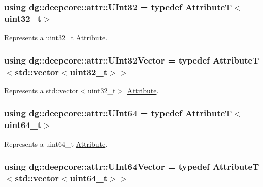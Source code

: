 \subsubsection[{\texorpdfstring{U\+Int32}{UInt32}}]{\setlength{\rightskip}{0pt plus 5cm}using {\bf dg\+::deepcore\+::attr\+::\+U\+Int32} = typedef AttributeT$<$uint32\+\_\+t$>$}\hypertarget{group___process_attributes_ga685518764bcfc2ffb146ef7eb5882b3b}{}\label{group___process_attributes_ga685518764bcfc2ffb146ef7eb5882b3b}


Represents a {\ttfamily uint32\+\_\+t} \hyperlink{classdg_1_1deepcore_1_1_attribute}{Attribute}. 

\subsubsection[{\texorpdfstring{U\+Int32\+Vector}{UInt32Vector}}]{\setlength{\rightskip}{0pt plus 5cm}using {\bf dg\+::deepcore\+::attr\+::\+U\+Int32\+Vector} = typedef AttributeT$<$std\+::vector$<$uint32\+\_\+t$>$$>$}\hypertarget{group___process_attributes_ga1d85384d2aafb87abb9b4512caa28127}{}\label{group___process_attributes_ga1d85384d2aafb87abb9b4512caa28127}


Represents a {\ttfamily std\+::vector$<$uint32\+\_\+t$>$} \hyperlink{classdg_1_1deepcore_1_1_attribute}{Attribute}. 

\subsubsection[{\texorpdfstring{U\+Int64}{UInt64}}]{\setlength{\rightskip}{0pt plus 5cm}using {\bf dg\+::deepcore\+::attr\+::\+U\+Int64} = typedef AttributeT$<$uint64\+\_\+t$>$}\hypertarget{group___process_attributes_gad89c97a988d87ed15cbb54d25ea8fd97}{}\label{group___process_attributes_gad89c97a988d87ed15cbb54d25ea8fd97}


Represents a {\ttfamily uint64\+\_\+t} \hyperlink{classdg_1_1deepcore_1_1_attribute}{Attribute}. 

\subsubsection[{\texorpdfstring{U\+Int64\+Vector}{UInt64Vector}}]{\setlength{\rightskip}{0pt plus 5cm}using {\bf dg\+::deepcore\+::attr\+::\+U\+Int64\+Vector} = typedef AttributeT$<$std\+::vector$<$uint64\+\_\+t$>$$>$}\hypertarget{group___process_attributes_gadd8cc39f67641bf2224cce7f27747c4f}{}\label{group___process_attributes_gadd8cc39f67641bf2224cce7f27747c4f}


